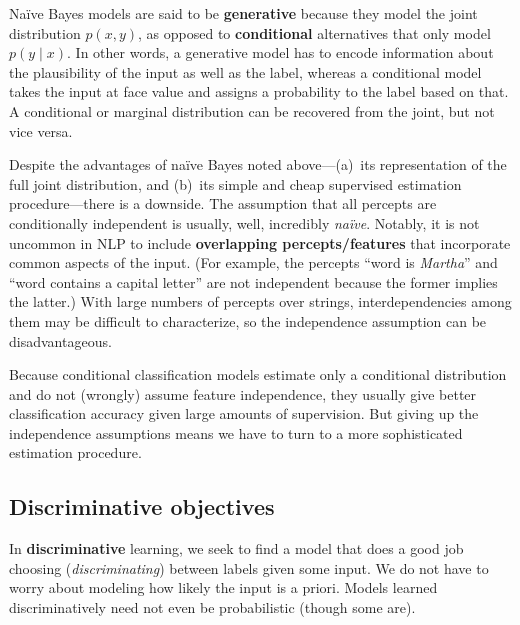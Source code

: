 \documentclass[11pt,letterpaper]{article}
\begin{document}
Na\"{i}ve Bayes models are said to be \textbf{generative} because they model 
the joint distribution $p(x,y)$, as opposed to \textbf{conditional} alternatives that only model $p(y \mid x)$.
In other words, a generative model has to encode information about the plausibility of the input as well as the label, 
whereas a conditional model takes the input at face value and assigns a probability to the label based on that.
A conditional or marginal distribution can be recovered from the joint, but not vice versa.

Despite the advantages of na\"{i}ve Bayes noted above---(a)~its representation of the full joint distribution, 
and (b)~its simple and cheap supervised estimation procedure---there is a downside. 
The assumption that all percepts are conditionally independent is usually, well, incredibly {\em na\"{i}ve}. 
Notably, it is not uncommon in NLP to include \textbf{overlapping percepts\slash features} 
that incorporate common aspects of the input. (For example, the percepts ``word is \textit{Martha}'' 
and ``word contains a capital letter'' are not independent because the former implies the latter.)
With large numbers of percepts over strings, interdependencies among them may be difficult to 
characterize, so the independence assumption can be disadvantageous. 

Because conditional classification models estimate only a conditional distribution and 
do not (wrongly) assume feature independence, they usually give better classification accuracy 
given large amounts of supervision. But giving up the independence assumptions 
means we have to turn to a more sophisticated estimation procedure.

\subsection{Discriminative objectives}

In \textbf{discriminative} learning, we seek to find a model that does a good job choosing 
(\textit{discriminating}) between labels given some input. 
We do not have to worry about modeling how likely the input is a priori.
Models learned discriminatively need not even be probabilistic (though some are).
\end{document}
